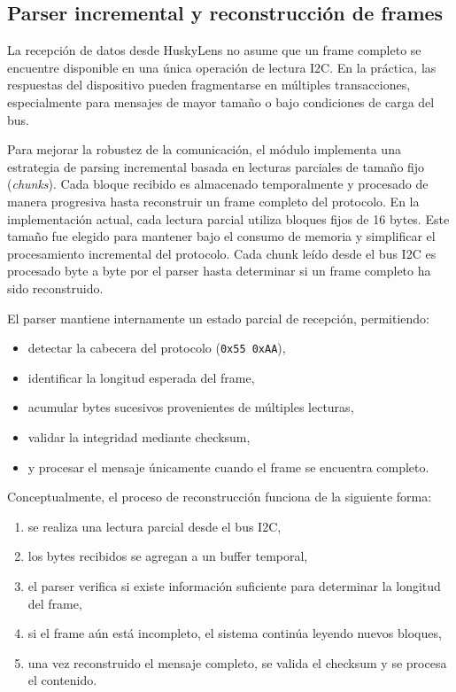\documentclass{prgrado}
\begin{document}
\subsection{Parser incremental y reconstrucción de frames}

La recepción de datos desde HuskyLens no asume que un frame completo se
encuentre disponible en una única operación de lectura I2C. En la práctica,
las respuestas del dispositivo pueden fragmentarse en múltiples transacciones,
especialmente para mensajes de mayor tamaño o bajo condiciones de carga del
bus.

Para mejorar la robustez de la comunicación, el módulo implementa una estrategia
de parsing incremental basada en lecturas parciales de tamaño fijo (\textit{chunks}).
Cada bloque recibido es almacenado temporalmente y procesado de manera
progresiva hasta reconstruir un frame completo del protocolo.
En la implementación actual, cada lectura parcial utiliza bloques fijos de 16 bytes. Este tamaño fue elegido para mantener bajo el consumo de memoria y simplificar el procesamiento incremental del protocolo. Cada chunk leído desde el bus I2C es procesado byte a byte por el parser hasta determinar si un frame completo ha sido reconstruido.

El parser mantiene internamente un estado parcial de recepción, permitiendo:

\begin{itemize}
    \item detectar la cabecera del protocolo (\texttt{0x55 0xAA}),
    \item identificar la longitud esperada del frame,
    \item acumular bytes sucesivos provenientes de múltiples lecturas,
    \item validar la integridad mediante checksum,
    \item y procesar el mensaje únicamente cuando el frame se encuentra completo.
\end{itemize}

Conceptualmente, el proceso de reconstrucción funciona de la siguiente forma:

\begin{enumerate}
    \item se realiza una lectura parcial desde el bus I2C,
    \item los bytes recibidos se agregan a un buffer temporal,
    \item el parser verifica si existe información suficiente para determinar la longitud del frame,
    \item si el frame aún está incompleto, el sistema continúa leyendo nuevos bloques,
    \item una vez reconstruido el mensaje completo, se valida el checksum y se procesa el contenido.
\end{enumerate}
\end{document}
